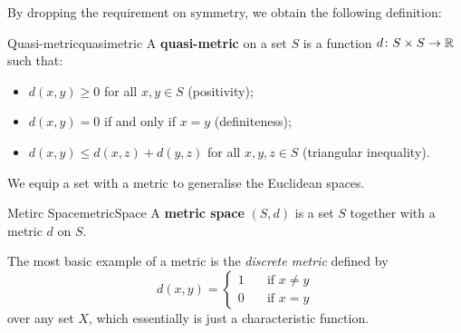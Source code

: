 \documentclass[math]{amznotes}
\theoremstyle{remark}
\begin{document}
By dropping the requirement on symmetry, we obtain the following definition:
\begin{dfnbox}{Quasi-metric}{quasimetric}
    A {\color{red} \textbf{quasi-metric}} on a set $S$ is a function $d \colon S \times S \to \mathbb{R}$ such that:
    \begin{itemize}
        \item $d\left(x, y\right) \geq 0$ for all $x, y \in S$ (positivity);
        \item $d\left(x, y\right) = 0$ if and only if $x = y$ (definiteness);
        \item $d\left(x, y\right) \leq d\left(x, z\right) + d\left(y, z\right)$ for all $x, y, z \in S$ (triangular inequality).
    \end{itemize}
\end{dfnbox}
We equip a set with a metric to generalise the Euclidean spaces.
\begin{dfnbox}{Metirc Space}{metricSpace}
    A {\color{red} \textbf{metric space}} $\left(S, d\right)$ is a set $S$ together with a metric $d$ on $S$.    
\end{dfnbox}
The most basic example of a metric is the \textit{discrete metric} defined by 
\begin{equation*}
    d\left(x, y\right) = \begin{cases}
        1 & \quad \textrm{if } x \neq y \\
        0 & \quad \textrm{if } x = y
    \end{cases}
\end{equation*}
over any set $X$, which essentially is just a characteristic function.
\end{document}
